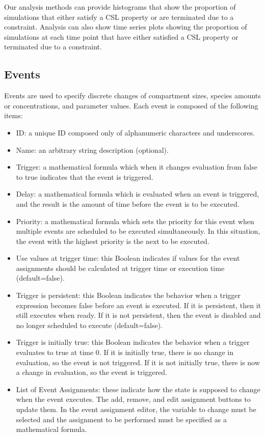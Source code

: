 \documentclass[titlepage,11pt]{article}
\begin{document}
Our analysis methods can provide histograms that show the proportion of simulations that either satisfy a CSL property or are terminated due to a constraint.  Analysis can also show time series plots showing the proportion of simulations at each time point that have either satisfied a CSL property or terminated due to a constraint. 

\subsection{\label{Events}Events}

\noindent
Events are used to specify discrete changes of compartment sizes, species amounts or concentrations, and parameter values.  Each event is composed of the following items:
\begin{itemize}
\item ID: a unique ID composed only of alphanumeric characters and underscores.
\item Name: an arbitrary string description (optional).
\item Trigger: a mathematical formula which when it changes evaluation from false to true indicates that the event is triggered.
\item Delay: a mathematical formula which is evaluated when an event is triggered, and the result is the amount of time before the event is to be executed.
\item Priority: a mathematical formula which sets the priority for this event when multiple events are scheduled to be executed simultaneously.  In this situation, the event with the highest priority is the next to be executed.
\item Use values at trigger time: this Boolean indicates if values for the event assignments should be calculated at trigger time or execution time (default=false).
\item Trigger is persistent: this Boolean indicates the behavior when a trigger expression becomes false before an event is executed.  If it is persistent, then it still executes when ready.  If it is not persistent, then the event is disabled and no longer scheduled to execute (default=false).
\item Trigger is initially true: this Boolean indicates the behavior when a trigger evaluates to true at time 0.  If it is initially true, there is no change in evaluation, so the event is not triggered.  If it is not initially true, there is now a change in evaluation, so the event is triggered.
\item List of Event Assignments: these indicate how the state is supposed to change when the event executes.  The add, remove, and edit assignment buttons to update them.  In the event assignment editor, the variable to change must be selected and the assignment to be performed must be specified as a mathematical formula.
\end{itemize}
\end{document}
